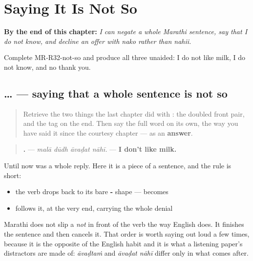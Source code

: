 
\chapter{Saying It Is Not So}
\label{ch:mr-sentence-negation}

\begin{chapteropening}
\textbf{By the end of this chapter:} \emph{I can negate a whole Marathi sentence, say that I do not know, and decline an offer with nako rather than nahii.}

Complete MR-R32-not-so and produce all three unaided: I do not like milk, I do not know, and no thank you.
\end{chapteropening}

\section[\texorpdfstring{… \mr{नाही} (… nāhī)}{… नाही (… nāhī)}]{…  — saying that a whole sentence is not so}

\label{lesson:MR-C32-nahi-verb}



\begin{quote}
Retrieve the two things the last chapter did with \textbf{}: the doubled front pair, and the tag on the end. Then say the full word \textbf{} on its own, the way you have said it since the courtesy chapter — as an \textbf{answer}.
\end{quote}

\begin{grammarlens}[title={Grammar Lens: \mr{नाही} at the end of a sentence, not instead of one}]
\begin{quote}
\textbf{   .} — \emph{malā dūdh āvaḍat nāhī.} — \textbf{I don't like milk.}
\end{quote}

Until now \textbf{} was a whole reply. Here it is a piece of a sentence, and the rule is short:

\begin{itemize}
\raggedright
  \item the verb drops back to its bare \textbf{-} shape — \textbf{} becomes \textbf{}
  \item \textbf{} follows it, at the very end, carrying the whole denial
\end{itemize}

Marathi does not slip a \emph{not} in front of the verb the way English does. It finishes the sentence and then cancels it. That order is worth saying out loud a few times, because it is the opposite of the English habit and it is what a listening paper's distractors are made of: \emph{āvaḍtaṁ} and \emph{āvaḍat nāhī} differ only in what comes after.
\end{grammarlens}

